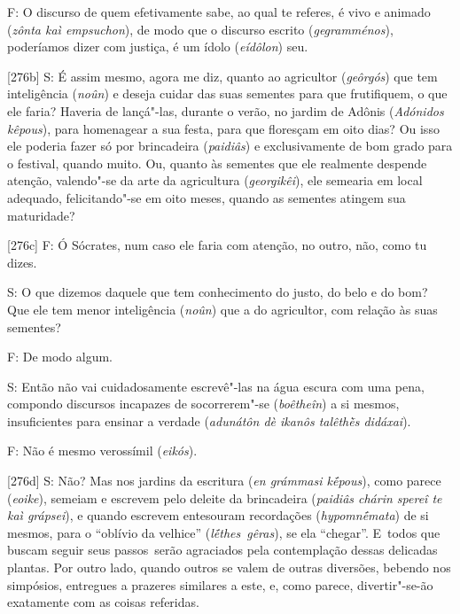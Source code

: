  

F: O discurso de quem efetivamente sabe, ao qual te referes, é vivo e
animado (\emph{zônta kaì empsuchon}), de modo que o discurso escrito
(\emph{gegramménos}), poderíamos dizer com justiça, é um ídolo
(\emph{eídôlon}) seu.

 

[276b] S: É assim mesmo, agora me diz, quanto ao agricultor
(\emph{geôrgós}) que tem inteligência (\emph{noûn}) e deseja cuidar das
suas sementes para que frutifiquem, o que ele faria? Haveria de
lançá"-las, durante o verão, no jardim de Adônis (\emph{Adónidos
kêpous}), para homenagear a sua festa, para que floresçam em oito dias?
Ou isso ele poderia fazer só por brincadeira (\emph{paidiâs}) e
exclusivamente de bom grado para o festival, quando muito. Ou, quanto às
sementes que ele realmente despende atenção, valendo"-se da arte da
agricultura (\emph{georgikêi}), ele semearia em local adequado,
felicitando"-se em oito meses, quando as sementes atingem sua maturidade?

 

[276c] F: Ó Sócrates, num caso ele faria com atenção, no outro, não,
como tu dizes.

 

S: O que dizemos daquele que tem conhecimento do justo, do belo e do
bom? Que ele tem menor inteligência (\emph{noûn}) que a do agricultor,
com relação às suas sementes?

 

F: De modo algum.

 

S: Então não vai cuidadosamente escrevê"-las na água escura com uma pena,
compondo discursos incapazes de socorrerem"-se (\emph{boêtheîn}) a si
mesmos, insuficientes para ensinar a verdade (\emph{adunátôn dè ikanôs
talêthḕs didáxai}).

 

F: Não é mesmo verossímil (\emph{eikós}).

 

[276d] S: Não? Mas nos jardins da escritura (\emph{en grámmasi
kḗpous}), como parece (\emph{eoike}), semeiam e escrevem pelo deleite da
brincadeira (\emph{paidiâs chárin spereî te kaì grápsei}), e quando
escrevem entesouram recordações (\emph{hypomnḗmata}) de si mesmos, para
o ``oblívio da velhice'' (\emph{lḗthes}~\emph{gêras}), se ela
``chegar''. E~todos que buscam seguir seus passos~serão agraciados pela
contemplação dessas delicadas plantas. Por outro lado, quando outros se
valem de outras diversões, bebendo nos simpósios, entregues a prazeres
similares a este, e, como parece, divertir"-se-ão exatamente com as
coisas referidas.

